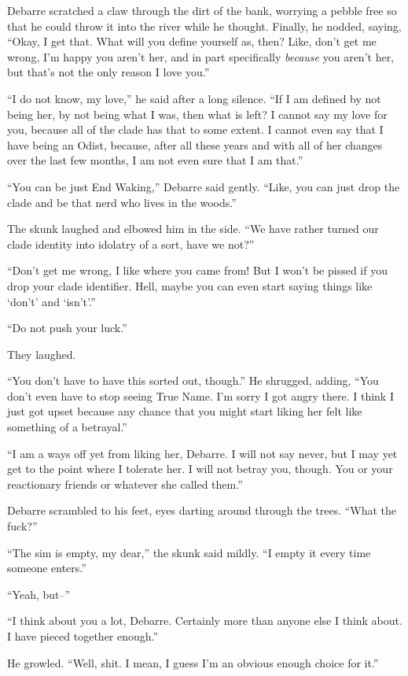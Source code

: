 Debarre scratched a claw through the dirt of the bank, worrying a pebble free so that he could throw it into the river while he thought. Finally, he nodded, saying, ``Okay, I get that. What will you define yourself as, then? Like, don't get me wrong, I'm happy you aren't her, and in part specifically \emph{because} you aren't her, but that's not the only reason I love you.''

``I do not know, my love,'' he said after a long silence. ``If I am defined by not being her, by not being what I was, then what is left? I cannot say my love for you, because all of the clade has that to some extent. I cannot even say that I have being an Odist, because, after all these years and with all of her changes over the last few months, I am not even sure that I am that.''

``You can be just End Waking,'' Debarre said gently. ``Like, you can just drop the clade and be that nerd who lives in the woods.''

The skunk laughed and elbowed him in the side. ``We have rather turned our clade identity into idolatry of a sort, have we not?''

``Don't get me wrong, I like where you came from! But I won't be pissed if you drop your clade identifier. Hell, maybe you can even start saying things like `don't' and `isn't'.''

``Do not push your luck.''

They laughed.

``You don't have to have this sorted out, though.'' He shrugged, adding, ``You don't even have to stop seeing True Name. I'm sorry I got angry there. I think I just got upset because any chance that you might start liking her felt like something of a betrayal.''

``I am a ways off yet from liking her, Debarre. I will not say never, but I may yet get to the point where I tolerate her. I will not betray you, though. You or your reactionary friends or whatever she called them.''

Debarre scrambled to his feet, eyes darting around through the trees. ``What the fuck?''

``The sim is empty, my dear,'' the skunk said mildly. ``I empty it every time someone enters.''

``Yeah, but--''

``I think about you a lot, Debarre. Certainly more than anyone else I think about. I have pieced together enough.''

He growled. ``Well, shit. I mean, I guess I'm an obvious enough choice for it.''

